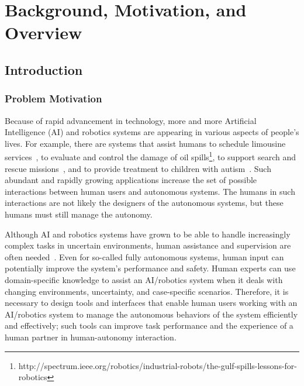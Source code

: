 \chapter{Background, Motivation, and Overview}
\label{chap:intro}

\section{Introduction}
\label{intro}

\subsection{Problem Motivation}
\label{motivation}

Because of rapid advancement in technology, more and more Artificial Intelligence (AI) and robotics systems are appearing in various aspects of people's lives. For example, there are systems that assist humans to schedule limousine services~\cite{Chun2010Limousine}, to evaluate and control the damage of oil spills\footnote{http://spectrum.ieee.org/robotics/industrial-robots/the-gulf-spills-lessons-for-robotics}, to support search and rescue missions~\cite{Casper2003Human,Lin2010Supporting}, and to provide treatment to children with autism~\cite{Robins2009From}. Such abundant and rapidly growing applications increase the set of possible interactions between human users and autonomous systems. The humans in such interactions are not likely the designers of the autonomous systems, but these humans must still manage the autonomy.

Although AI and robotics systems have grown to be able to handle increasingly complex tasks in uncertain environments, human assistance and supervision are often needed~\cite{Bainbridge1983Ironies}. Even for so-called fully autonomous systems, human input can potentially improve the system's performance and safety. Human experts can use domain-specific knowledge to assist an AI/robotics system when it deals with changing environments, uncertainty, and case-specific scenarios. Therefore, it is necessary to design tools and interfaces that enable human users working with an AI/robotics system to manage the autonomous behaviors of the system efficiently and effectively; such tools can improve task performance and the experience of a human partner in human-autonomy interaction. 

